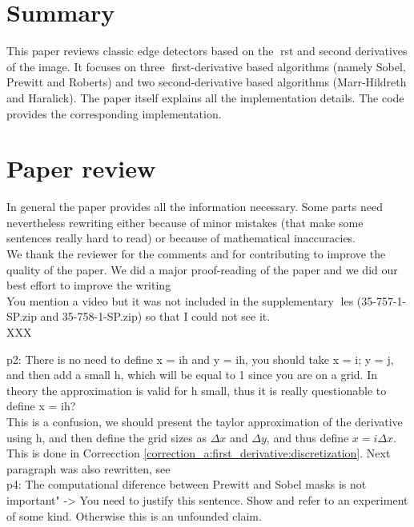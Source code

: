 \documentclass[a4paper,10pt]{report}
\begin{document}
\section{Summary}

\que This paper reviews classic edge detectors based on the rst and second derivatives of the image. It focuses
on three first-derivative based algorithms (namely Sobel, Prewitt and Roberts) and two second-derivative
based algorithms (Marr-Hildreth and Haralick). The paper itself explains all the implementation details.
The code provides the corresponding implementation.\\

\section{Paper review}

\que In general the paper provides all the information necessary. Some parts need nevertheless rewriting either because of minor mistakes (that make some sentences really hard to read) or because of mathematical inaccuracies.\\

\ans We thank the reviewer for the comments and for contributing to improve the quality of the paper. We did a major proof-reading of the paper and we did our best effort to improve the writing\\

\que You mention a video but it was not included in the supplementary les (35-757-1-SP.zip and 35-758-1-SP.zip) so that I could not see it.\\

\ans XXX

\que p2: There is no need to define x = ih and y = ih, you should take x = i; y = j, and then add a small h, which will be equal to 1 since you are on a grid. In theory the approximation is valid for h small, thus it is really questionable to define x = ih? \\

\ans This is a confusion, we should present the taylor approximation of the derivative using h, and then define the grid sizes as $\Delta x$ and $\Delta y$, and thus define $x=i\Delta x$. This is done in Correcction \ref{correction_a:first_derivative:discretization}. Next paragraph was also rewritten, see \\

\que p4: The computational diference between Prewitt and Sobel masks is not important" -> You need to justify this sentence. Show and refer to an experiment of some kind. Otherwise this is an unfounded claim. \\
\end{document}
